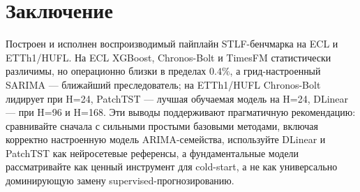 \documentclass[conference]{IEEEtran}
\begin{document}
\section{Заключение}
Построен и исполнен воспроизводимый пайплайн STLF-бенчмарка на ECL и ETTh1/HUFL. На ECL XGBoost, Chronos-Bolt и TimesFM статистически различимы, но операционно близки в пределах $0.4\%$, а грид-настроенный SARIMA --- ближайший преследователь; на ETTh1/HUFL Chronos-Bolt лидирует при H=24, PatchTST --- лучшая обучаемая модель на H=24, DLinear --- при H=96 и H=168. Эти выводы поддерживают прагматичную рекомендацию: сравнивайте сначала с сильными простыми базовыми методами, включая корректно настроенную модель ARIMA-семейства, используйте DLinear и PatchTST как нейросетевые референсы, а фундаментальные модели рассматривайте как ценный инструмент для cold-start, а не как универсально доминирующую замену supervised-прогнозированию.



\end{document}

